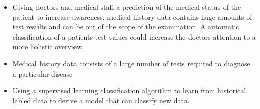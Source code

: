 \begin{itemize}
	\item Giving doctors and medical staff a prediction of the medical status of the patient to increase awareness. medical history data contains huge amounts of test results and can be out of the scope of the examination. A automatic classification of a patients test values could increase the doctors attention to a more holistic overview. 
	\item Medical history data consists of a large number of tests required to diagnose a particular disease \citep{gupta2007}
	\item Using a supervised learning classification algorithm to learn from historical, labled data to derive a model that can classify new data.
\end{itemize}
